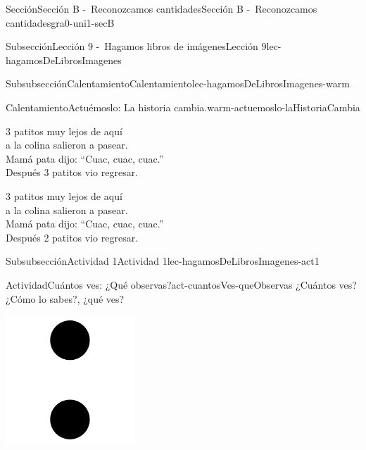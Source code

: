 \documentclass[twoside,10pt,]{article}
\begin{document}
\begin{sectionptx}{Sección}{Sección B -~Reconozcamos cantidades}{}{Sección B -~Reconozcamos cantidades}{}{}{gra0-uni1-secB}
\begin{subsectionptx}{Subsección}{Lección 9 -~Hagamos libros de imágenes}{}{Lección 9}{}{}{lec-hagamosDeLibrosImagenes}
\begin{subsubsectionptx}{Subsubsección}{Calentamiento}{}{Calentamiento}{}{}{lec-hagamosDeLibrosImagenes-warm}
\begin{exploration}{Calentamiento}{Actuémoslo: La historia cambia.}{warm-actuemoslo-laHistoriaCambia}
\begin{image}{0.2}{0.6}{0.2}{}
\end{image}%
%
\par
3 patitos muy lejos de aquí\\
 a la colina salieron a pasear.\\
 Mamá pata dijo: “Cuac, cuac, cuac.”\\
 Después 3 patitos vio regresar.%
\par
3 patitos muy lejos de aquí\\
 a la colina salieron a pasear.\\
 Mamá pata dijo: “Cuac, cuac, cuac.”\\
 Después 2 patitos vio regresar.%
\end{exploration}%
\end{subsubsectionptx}
%
%
\typeout{************************************************}
\typeout{************************************************}
%
\begin{subsubsectionptx}{Subsubsección}{Actividad 1}{}{Actividad 1}{}{}{lec-hagamosDeLibrosImagenes-act1}
\begin{activity}{Actividad}{Cuántos ves: ¿Qué observas?}{act-cuantosVes-queObservas}%
¿Cuántos ves?\\
 ¿Cómo lo sabes?, ¿qué ves?%
\begin{sidebyside}{2}{0}{0}{0}%
\begin{sbspanel}{0.5}%
\includegraphics[width=\linewidth]{external/svg-source/tikz-file-148154.pdf}

\end{sbspanel}
\end{sidebyside}
\end{activity}
\end{subsubsectionptx}
\end{subsectionptx}
\end{sectionptx}
\end{document}
